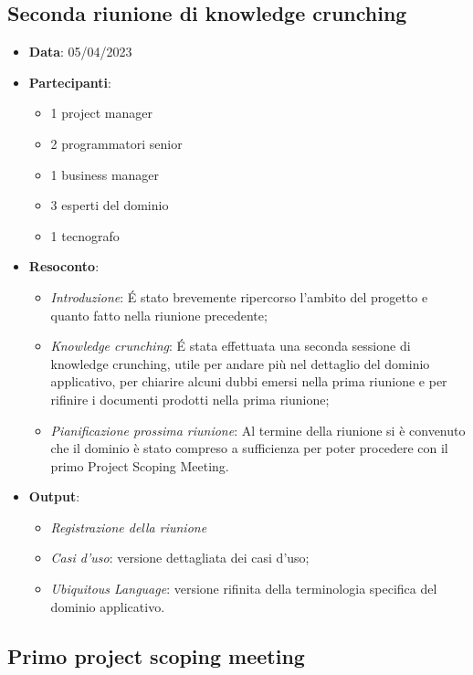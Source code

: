 \documentclass{article}
\begin{document}
  \subsection{Seconda riunione di knowledge crunching}
  \begin{itemize}
    \item \textbf{Data}: 05/04/2023
    \item \textbf{Partecipanti}:
    \begin{itemize}
      \item 1 project manager
      \item 2 programmatori senior
      \item 1 business manager
      \item 3 esperti del dominio
      \item 1 tecnografo
    \end{itemize}
    \item \textbf{Resoconto}:
    \begin{itemize}
      \item \emph{Introduzione}: 
        É stato brevemente ripercorso l'ambito del progetto e quanto fatto nella riunione precedente;
      \item \emph{Knowledge crunching}:
        É stata effettuata una seconda sessione di knowledge crunching, utile per andare più nel dettaglio del dominio 
          applicativo, per chiarire alcuni dubbi emersi nella prima riunione e per rifinire i documenti prodotti nella prima riunione;
      \item \emph{Pianificazione prossima riunione}:
        Al termine della riunione si è convenuto che il dominio è stato compreso a sufficienza per poter procedere con il primo Project
        Scoping Meeting.
    \end{itemize}
    \item \textbf{Output}:
    \begin{itemize}
      \item \emph{Registrazione della riunione}
      \item \emph{Casi d'uso}: versione dettagliata dei casi d'uso;
      \item \emph{Ubiquitous Language}: versione rifinita della terminologia specifica del dominio applicativo.
    \end{itemize}
  \end{itemize}

  \subsection{Primo project scoping meeting}
\end{document}
